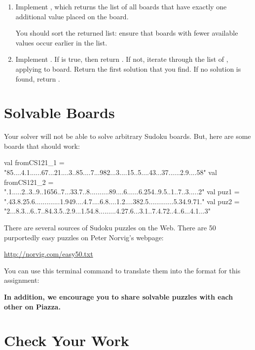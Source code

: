 \documentclass{book}
\begin{document}
\begin{enumerate}
\item Implement , which returns the list of all boards that have
   exactly one additional value placed on the board.

   You should sort the returned list: ensure that boards with fewer available
   values occur earlier in the list.

\item Implement . If  is true, then return .
   If not, iterate through the list of , applying  to
   board. Return the first solution that you find. If no solution is found,
   return .

\end{enumerate}


\section{Solvable Boards}

Your solver will not be able to solve arbitrary Sudoku boards. But,
here are some boards that should work:

\begin{scalacode}
val fromCS121_1 = "85....4.1......67...21....3..85....7...982...3....15..5....43...37......2.9....58"
val fromCS121_2 = ".1.....2..3..9..1656..7...33.7..8..........89....6......6.254..9.5..1..7..3.....2"
val puz1 = ".43.8.25.6.............1.949....4.7....6.8....1.2....382.5.............5.34.9.71."
val puz2 = "2...8.3...6..7..84.3.5..2.9...1.54.8.........4.27.6...3.1..7.4.72..4..6...4.1...3"
\end{scalacode}

There are several sources of Sudoku puzzles on the Web. There are
50 purportedly easy puzzles on Peter Norvig's webpage:

\url{http://norvig.com/easy50.txt}

You can use this terminal command to translate them into the format for this assignment:


\textbf{In addition, we encourage you to share solvable puzzles with each other on Piazza.}

\section{Check Your Work}
\end{document}
